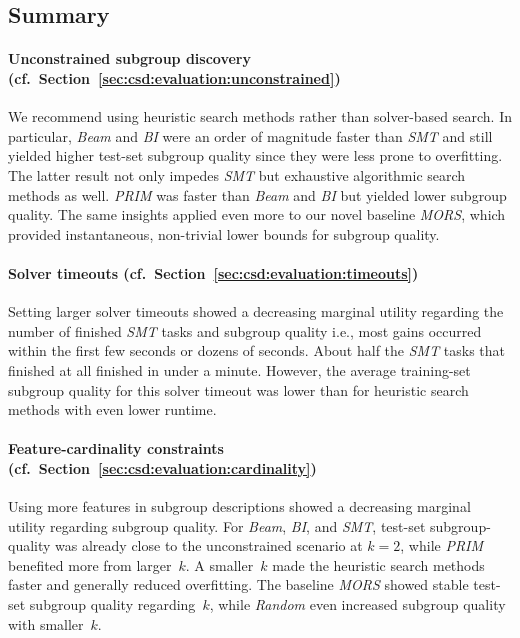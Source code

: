 \documentclass{article}
\theoremstyle{definition}
\begin{document}
\subsection{Summary}
\label{sec:csd:evaluation:summary}

\paragraph{Unconstrained subgroup discovery (cf.~Section~\ref{sec:csd:evaluation:unconstrained})}

We recommend using heuristic search methods rather than solver-based search.
In particular, \emph{Beam} and \emph{BI} were an order of magnitude faster than \emph{SMT} and still yielded higher test-set subgroup quality since they were less prone to overfitting.
The latter result not only impedes \emph{SMT} but exhaustive algorithmic search methods as well.
\emph{PRIM} was faster than \emph{Beam} and \emph{BI} but yielded lower subgroup quality.
The same insights applied even more to our novel baseline \emph{MORS}, which provided instantaneous, non-trivial lower bounds for subgroup quality.

\paragraph{Solver timeouts (cf.~Section~\ref{sec:csd:evaluation:timeouts})}

Setting larger solver timeouts showed a decreasing marginal utility regarding the number of finished \emph{SMT} tasks and subgroup quality i.e., most gains occurred within the first few seconds or dozens of seconds.
About half the \emph{SMT} tasks that finished at all finished in under a minute.
However, the average training-set subgroup quality for this solver timeout was lower than for heuristic search methods with even lower runtime.

\paragraph{Feature-cardinality constraints (cf.~Section~\ref{sec:csd:evaluation:cardinality})}

Using more features in subgroup descriptions showed a decreasing marginal utility regarding subgroup quality.
For \emph{Beam}, \emph{BI}, and \emph{SMT}, test-set subgroup-quality was already close to the unconstrained scenario at $k=2$, while \emph{PRIM} benefited more from larger~$k$.
A smaller~$k$ made the heuristic search methods faster and generally reduced overfitting.
The baseline \emph{MORS} showed stable test-set subgroup quality regarding~$k$, while \emph{Random} even increased subgroup quality with smaller~$k$.
\end{document}
